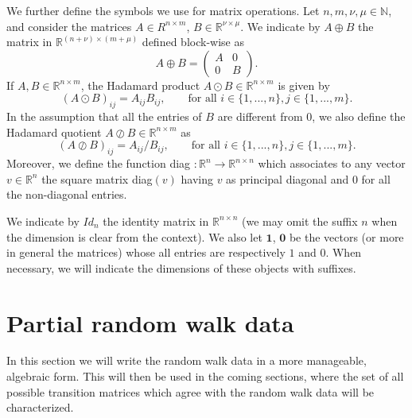 \documentclass[a4paper,11pt,oneside]{amsart}
\newcommand{\R}{{\mathbb R}}
\newcommand{\N}{{\mathbb N}}
\begin{document}
We further define the symbols we use for matrix operations. Let $n,m,\nu,\mu \in\N$, and consider the matrices $A\in R^{n\times m}$, $B\in \R^{\nu\times\mu}$. We indicate by $A\oplus B$ the matrix in $\R^{(n+\nu)\times (m+\mu)}$ defined block-wise as
$$A\oplus B = \left(\begin{array}{cc}
    A & 0 \\
    0 & B
\end{array}\right).$$
If $A,B\in \R^{n\times m}$, the Hadamard product $A\odot B \in \R^{n\times m}$ is given by $$ (A\odot B)_{ij} = A_{ij}B_{ij}, \qquad \mbox{for all } i\in\{1,...,n\}, j\in\{1,...,m\}.$$
In the assumption that all the entries of $B$ are different from $0$, we also define the Hadamard quotient $A\oslash B \in \R^{n\times m}$ as $$ (A\oslash B)_{ij} = A_{ij}/B_{ij}, \qquad \mbox{for all } i\in\{1,...,n\}, j\in\{1,...,m\}.$$
Moreover, we define the function diag $ : \R^n \rightarrow \R^{n\times n}$ which associates to any vector $v\in \R^{n}$ the square matrix diag$(v)$ having $v$ as principal diagonal and $0$ for all the non-diagonal entries.

We indicate by $Id_n$ the identity matrix in $\R^{n\times n}$ (we may omit the suffix $n$ when the dimension is clear from the context). We also let $\mathbf 1$, $\mathbf 0$ be the vectors (or more in general the matrices) whose all entries are respectively $1$ and $0$. When necessary, we will indicate the dimensions of these objects with suffixes. 

\section{ Partial random walk data }\label{sec:random-walk-data}
In this section we will write the random walk data in a more manageable, algebraic form. This will then be used in the coming sections, where the set of all possible transition matrices which agree with the random walk data will be characterized. \\
\end{document}
